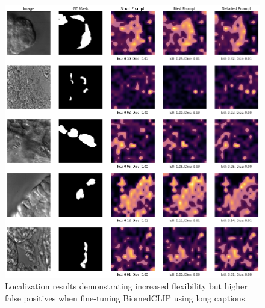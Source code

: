 \documentclass[./dissertation.tex]{subfiles}
\begin{document}
\begin{figure}
  \centering
  \includegraphics[width=\textwidth]{figures/sam/train with long captions.png}
  \caption{Localization results demonstrating increased flexibility but higher false positives when fine-tuning BiomedCLIP using long captions.}
  \label{fig:train_long_captions}
\end{figure}
\end{document}

